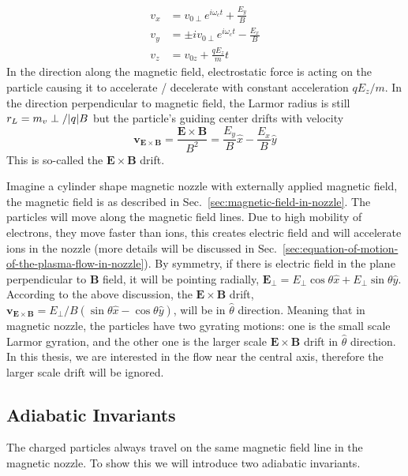 \begin{equation}
	\begin{aligned}
		v_x & = v_{0\perp} e^{i\omega_c t} + \frac{E_y}{B}      \\
		v_y & = \pm iv_{0\perp} e^{i\omega_c t} - \frac{E_x}{B} \\
		v_z & = v_{0z} + \frac{qE_z}{m}t
	\end{aligned}
\end{equation}
In the direction along the magnetic field, electrostatic force is acting on the particle causing it to accelerate / decelerate with constant acceleration $qE_z/m$. In the direction perpendicular to magnetic field, the Larmor radius is still $r_L = m_v\perp/\abs{q}B$ but the particle's guiding center drifts with velocity
\begin{equation}
	\mathbf{v_{E\times B}} = \frac{\mathbf{E\times B}}{B^2} = \frac{E_y}{B}\hat{x} - \frac{E_x}{B}\hat{y}
\end{equation}
This is so-called the $\mathbf{E\times B}$ drift.

Imagine a cylinder shape magnetic nozzle with externally applied magnetic field, the magnetic field is as described in Sec.~\ref{sec:magnetic-field-in-nozzle}. The particles will move along the magnetic field lines. Due to high mobility of electrons, they move faster than ions, this creates electric field and will accelerate ions in the nozzle (more details will be discussed in Sec.~\ref{sec:equation-of-motion-of-the-plasma-flow-in-nozzle}). By symmetry, if there is electric field in the plane perpendicular to $\mathbf{B}$ field, it will be pointing radially, $\mathbf{E_\perp} = E_\perp\cos\theta\hat{x} + E_\perp\sin\theta\hat{y}$. According to the above discussion, the $\mathbf{E\times B}$ drift, $\mathbf{v_{E\times B}} = E_\perp/B (\sin\theta\hat{x} - \cos\theta\hat{y})$, will be in $\hat{\theta}$ direction. Meaning that in magnetic nozzle, the particles have two gyrating motions: one is the small scale Larmor gyration, and the other one is the larger scale $\mathbf{E\times B}$ drift in $\hat{\theta}$ direction. In this thesis, we are interested in the flow near the central axis, therefore the larger scale drift will be ignored.

\subsection{Adiabatic Invariants}
The charged particles always travel on the same magnetic field line in the magnetic nozzle. To show this we will introduce two adiabatic invariants.

